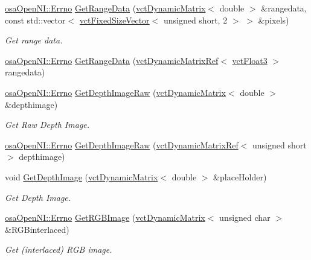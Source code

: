 \begin{DoxyCompactItemize}
\hyperlink{classosa_open_n_i_a9f02bd17e25b1ee362b08c5620e307db}{osa\-Open\-N\-I\-::\-Errno} \hyperlink{classosa_open_n_i_ac67e70112f985be0efb4dda6896d9390}{Get\-Range\-Data} (\hyperlink{classvct_dynamic_matrix}{vct\-Dynamic\-Matrix}$<$ double $>$ \&rangedata, const std\-::vector$<$ \hyperlink{classvct_fixed_size_vector}{vct\-Fixed\-Size\-Vector}$<$ unsigned short, 2 $>$ $>$ \&pixels)
\begin{DoxyCompactList}\small\item\em Get range data. \end{DoxyCompactList}\item 
\hyperlink{classosa_open_n_i_a9f02bd17e25b1ee362b08c5620e307db}{osa\-Open\-N\-I\-::\-Errno} \hyperlink{classosa_open_n_i_aa2cb47bba5e702d4fcae67d953d39038}{Get\-Range\-Data} (\hyperlink{classvct_dynamic_matrix_ref}{vct\-Dynamic\-Matrix\-Ref}$<$ \hyperlink{vct_fixed_size_vector_types_8h_a86116f095b661a1ffb5f630c06ee258d}{vct\-Float3} $>$ rangedata)
\item 
\hyperlink{classosa_open_n_i_a9f02bd17e25b1ee362b08c5620e307db}{osa\-Open\-N\-I\-::\-Errno} \hyperlink{classosa_open_n_i_a0579a51988077caa18d42b25f11dc2d6}{Get\-Depth\-Image\-Raw} (\hyperlink{classvct_dynamic_matrix}{vct\-Dynamic\-Matrix}$<$ double $>$ \&depthimage)
\begin{DoxyCompactList}\small\item\em Get Raw Depth Image. \end{DoxyCompactList}\item 
\hyperlink{classosa_open_n_i_a9f02bd17e25b1ee362b08c5620e307db}{osa\-Open\-N\-I\-::\-Errno} \hyperlink{classosa_open_n_i_a36243cc48387638c3ed79defde032508}{Get\-Depth\-Image\-Raw} (\hyperlink{classvct_dynamic_matrix_ref}{vct\-Dynamic\-Matrix\-Ref}$<$ unsigned short $>$ depthimage)
\item 
void \hyperlink{classosa_open_n_i_a72d3c7f988902ebc0923214938cc8a88}{Get\-Depth\-Image} (\hyperlink{classvct_dynamic_matrix}{vct\-Dynamic\-Matrix}$<$ double $>$ \&place\-Holder)
\begin{DoxyCompactList}\small\item\em Get Depth Image. \end{DoxyCompactList}\item 
\hyperlink{classosa_open_n_i_a9f02bd17e25b1ee362b08c5620e307db}{osa\-Open\-N\-I\-::\-Errno} \hyperlink{classosa_open_n_i_aef356d793e6451703d8e133d30291691}{Get\-R\-G\-B\-Image} (\hyperlink{classvct_dynamic_matrix}{vct\-Dynamic\-Matrix}$<$ unsigned char $>$ \&R\-G\-Binterlaced)
\begin{DoxyCompactList}\small\item\em Get (interlaced) R\-G\-B image. \end{DoxyCompactList}\item 

\end{DoxyCompactItemize}
